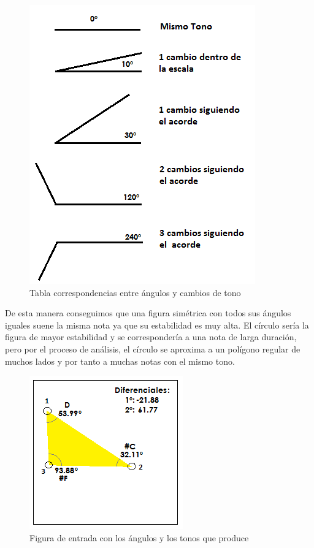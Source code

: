 		\begin{figure}[htbp]
		\centering
		\hspace*{0.0in}
		\includegraphics[scale=0.75]{graphics/tabla-corresp-Tono-Angulo.png}
		\caption{Tabla correspondencias entre ángulos y cambios de tono}
		\label{fig:Figura3Voz1}
		\end{figure}

De esta manera conseguimos que una figura simétrica con todos sus ángulos iguales suene la misma nota ya que su estabilidad es muy alta. El círculo sería la figura de mayor estabilidad y se correspondería a una nota de larga duración, pero por el proceso de análisis, el círculo se aproxima a un polígono regular de muchos lados y por tanto a muchas notas con el mismo tono.

		\begin{figure}[htbp]
		\centering
		\hspace*{0.0in}
		\includegraphics[scale=1.0]{graphics/simpletest1-F3.png}
		\caption{Figura de entrada con los ángulos y los tonos que produce}
		\label{fig:Figura4Voz1}
		\end{figure}

